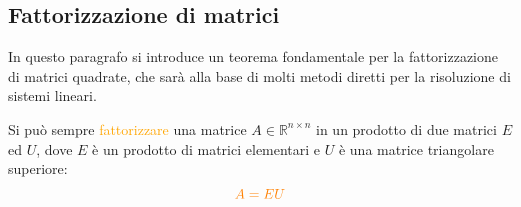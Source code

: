 \subsection{Fattorizzazione di matrici}

In questo paragrafo si introduce un teorema fondamentale per la fattorizzazione di matrici quadrate, che sarà alla base di molti metodi diretti per la risoluzione di sistemi lineari.

\begin{theorem}\label{teorema:fatt_matrici_quadrate}
    Si può sempre \textcolor{orange}{fattorizzare} una matrice $A \in \mathbb{R}^{n \times n}$ in un prodotto di due matrici $E$ ed $U$,
    dove $E$ è un prodotto di matrici elementari e $U$ è una matrice triangolare superiore:
    \[\textcolor{orange}{A = EU}\]
\end{theorem}

